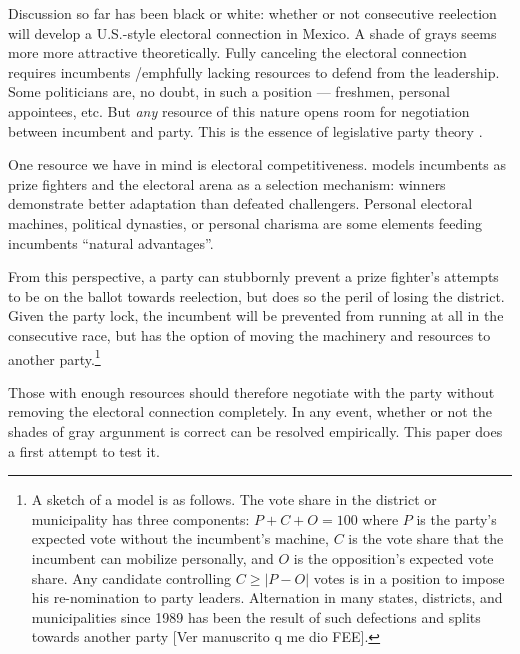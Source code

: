 \documentclass[letter,12pt]{article}
\begin{document}

Discussion so far has been black or white: whether or not consecutive reelection will develop a U.S.-style electoral connection in Mexico. A shade of grays seems more more attractive theoretically. Fully canceling the electoral connection requires incumbents /emph{fully} lacking resources to defend from the leadership. Some politicians are, no doubt, in such a position --- freshmen, personal appointees, etc. But \emph{any} resource of this nature opens room for negotiation between incumbent and party. This is the essence of legislative party theory \citep{cox.mccubbins.1993,aldrich.rohdeCPG2001}.

One resource we have in mind is electoral competitiveness. \citet{zallerprizeFighters} models incumbents as prize fighters and the electoral arena as a selection mechanism: winners demonstrate better adaptation than defeated challengers. Personal electoral machines, political dynasties, or personal charisma are some elements feeding incumbents ``natural advantages''. 

From this perspective, a party can stubbornly prevent a prize fighter's attempts to be on the ballot towards reelection, but does so the peril of losing the district. Given the party lock, the incumbent will be prevented from running at all in the consecutive race, but has the option of moving the machinery and resources to another party.\footnote{A sketch of a model is as follows. The vote share in the district or municipality has three components: $P + C + O = 100$ where $P$ is the party's expected vote without the incumbent's machine, $C$ is the vote share that the incumbent can mobilize personally, and $O$ is the opposition's expected vote share. Any candidate controlling $C \ge |P-O|$ votes is in a position to impose his re-nomination to party leaders. Alternation in many states, districts, and municipalities since 1989 has been the result of such defections and splits towards another party [Ver manuscrito q me dio FEE].}

Those with enough resources should therefore negotiate with the party without removing the electoral connection completely. In any event, whether or not the shades of gray argunment is correct can be resolved empirically. This paper does a first attempt to test it. 
\end{document}
